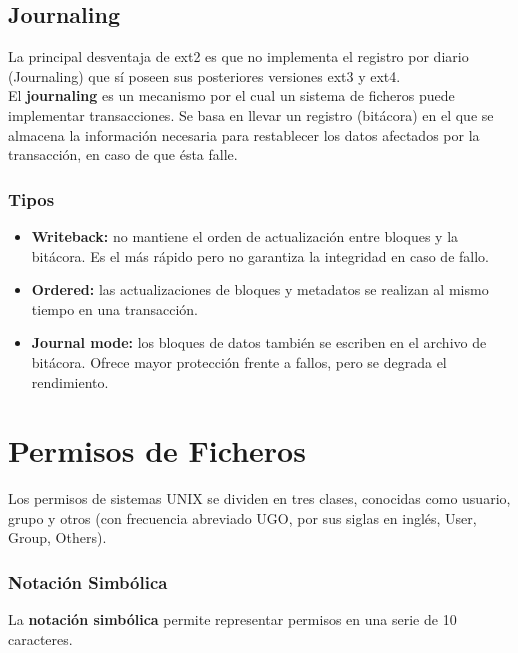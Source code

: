 \subsection{Journaling}
La principal desventaja de ext2 es que no implementa el registro por diario (Journaling) que sí poseen sus posteriores versiones ext3 y ext4.\\

El \textbf{journaling} es un mecanismo por el cual un sistema de ficheros puede implementar transacciones. Se basa en llevar un registro (bitácora) en el que se almacena la información necesaria para restablecer los datos afectados por la transacción, en caso de que ésta falle.

\subsubsection{Tipos}
\begin{itemize}
    \item \textbf{Writeback: }no mantiene el orden de actualización entre bloques y la bitácora. Es el más rápido pero no garantiza la integridad en caso de fallo.
    \item \textbf{Ordered: }las actualizaciones de bloques y metadatos se realizan al mismo tiempo en una transacción.
    \item \textbf{Journal mode: }los bloques de datos también se escriben en el archivo de bitácora. Ofrece mayor protección frente a fallos, pero se degrada el rendimiento.
\end{itemize}
\section{Permisos de Ficheros}
Los permisos de sistemas UNIX se dividen en tres clases, conocidas como usuario, grupo y otros (con frecuencia abreviado UGO, por sus siglas en inglés, User, Group, Others).

\subsubsection{Notación Simbólica}
La \textbf{notación simbólica} permite representar permisos en una serie de 10 caracteres.\\

